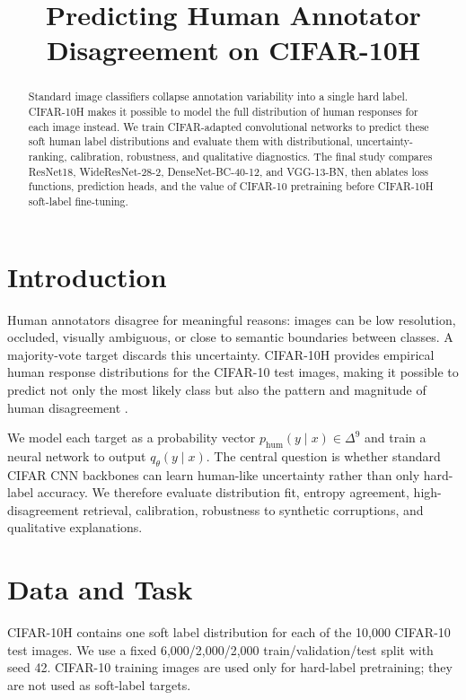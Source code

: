 \documentclass[10pt,conference]{IEEEtran}
\title{Predicting Human Annotator Disagreement on CIFAR-10H}
\author{
\IEEEauthorblockN{Saiankit Shankar, Sushan Govardhanam, Pranav Reddy Mitta, Nitin Riyala}
\IEEEauthorblockA{Soft Neural Networks Project}
}
\begin{document}
\maketitle

\begin{abstract}
Standard image classifiers collapse annotation variability into a single hard label. CIFAR-10H makes it possible to model the full distribution of human responses for each image instead. We train CIFAR-adapted convolutional networks to predict these soft human label distributions and evaluate them with distributional, uncertainty-ranking, calibration, robustness, and qualitative diagnostics. The final study compares ResNet18, WideResNet-28-2, DenseNet-BC-40-12, and VGG-13-BN, then ablates loss functions, prediction heads, and the value of CIFAR-10 pretraining before CIFAR-10H soft-label fine-tuning.
\end{abstract}

\section{Introduction}
Human annotators disagree for meaningful reasons: images can be low resolution, occluded, visually ambiguous, or close to semantic boundaries between classes. A majority-vote target discards this uncertainty. CIFAR-10H provides empirical human response distributions for the CIFAR-10 test images, making it possible to predict not only the most likely class but also the pattern and magnitude of human disagreement \cite{peterson2019cifar10h,krizhevsky2009cifar}.

We model each target as a probability vector $p_{\mathrm{hum}}(y\mid x)\in\Delta^{9}$ and train a neural network to output $q_\theta(y\mid x)$. The central question is whether standard CIFAR CNN backbones can learn human-like uncertainty rather than only hard-label accuracy. We therefore evaluate distribution fit, entropy agreement, high-disagreement retrieval, calibration, robustness to synthetic corruptions, and qualitative explanations.

\section{Data and Task}
CIFAR-10H contains one soft label distribution for each of the 10,000 CIFAR-10 test images. We use a fixed 6,000/2,000/2,000 train/validation/test split with seed 42. CIFAR-10 training images are used only for hard-label pretraining; they are not used as soft-label targets.
\end{document}
